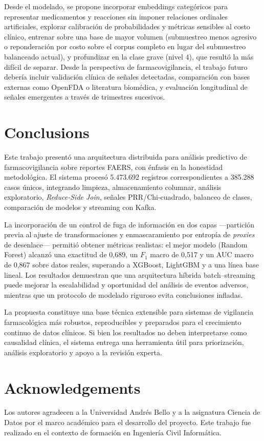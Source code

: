 \documentclass[12pt,a4paper]{article}
\begin{document}
Desde el modelado, se propone incorporar embeddings categóricos para representar medicamentos y reacciones sin imponer relaciones ordinales artificiales, explorar calibración de probabilidades y métricas sensibles al costo clínico, entrenar sobre una base de mayor volumen (submuestreo menos agresivo o reponderación por costo sobre el corpus completo en lugar del submuestreo balanceado actual), y profundizar en la clase grave (nivel 4), que resultó la más difícil de separar. Desde la perspectiva de farmacovigilancia, el trabajo futuro debería incluir validación clínica de señales detectadas, comparación con bases externas como OpenFDA o literatura biomédica, y evaluación longitudinal de señales emergentes a través de trimestres sucesivos.

\section{Conclusions}
Este trabajo presentó una arquitectura distribuida para análisis predictivo de farmacovigilancia sobre reportes FAERS, con énfasis en la honestidad metodológica. El sistema procesó 5.473.692 registros correspondientes a 385.288 casos únicos, integrando limpieza, almacenamiento columnar, análisis exploratorio, \textit{Reduce-Side Join}, señales PRR/Chi-cuadrado, balanceo de clases, comparación de modelos y streaming con Kafka.

La incorporación de un control de fuga de información en dos capas —partición previa al ajuste de transformaciones y enmascaramiento por entropía de \textit{proxies} de desenlace— permitió obtener métricas realistas: el mejor modelo (Random Forest) alcanzó una exactitud de 0,689, un \(F_1\) macro de 0,517 y un AUC macro de 0,867 sobre datos reales, superando a XGBoost, LightGBM y a una línea base lineal. Los resultados demuestran que una arquitectura híbrida batch--streaming puede mejorar la escalabilidad y oportunidad del análisis de eventos adversos, mientras que un protocolo de modelado riguroso evita conclusiones infladas.

La propuesta constituye una base técnica extensible para sistemas de vigilancia farmacológica más robustos, reproducibles y preparados para el crecimiento continuo de datos clínicos. Si bien los resultados no deben interpretarse como causalidad clínica, el sistema entrega una herramienta útil para priorización, análisis exploratorio y apoyo a la revisión experta.

\section*{Acknowledgements}
Los autores agradecen a la Universidad Andrés Bello y a la asignatura Ciencia de Datos por el marco académico para el desarrollo del proyecto. Este trabajo fue realizado en el contexto de formación en Ingeniería Civil Informática.
\end{document}
